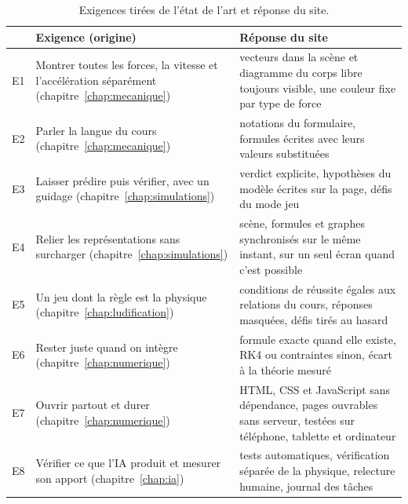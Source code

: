 \begin{table}[ht]
  \centering
  \small
  \caption{Exigences tirées de l'état de l'art et réponse du site.}
  \label{tab:exigences}
  \begin{tabularx}{\linewidth}{@{}l X X@{}}
    \toprule
    & Exigence (origine) & Réponse du site \\
    \midrule
    E1 & Montrer toutes les forces, la vitesse et l'accélération séparément
         (chapitre~\ref{chap:mecanique}) &
         vecteurs dans la scène et diagramme du corps libre toujours visible,
         une couleur fixe par type de force \\
    E2 & Parler la langue du cours (chapitre~\ref{chap:mecanique}) &
         notations du formulaire, formules écrites avec leurs valeurs
         substituées \\
    E3 & Laisser prédire puis vérifier, avec un guidage
         (chapitre~\ref{chap:simulations}) &
         verdict explicite, hypothèses du modèle écrites sur la page, défis
         du mode jeu \\
    E4 & Relier les représentations sans surcharger
         (chapitre~\ref{chap:simulations}) &
         scène, formules et graphes synchronisés sur le même instant, sur un
         seul écran quand c'est possible \\
    E5 & Un jeu dont la règle est la physique
         (chapitre~\ref{chap:ludification}) &
         conditions de réussite égales aux relations du cours, réponses
         masquées, défis tirés au hasard \\
    E6 & Rester juste quand on intègre (chapitre~\ref{chap:numerique}) &
         formule exacte quand elle existe, RK4 ou contraintes sinon, écart à
         la théorie mesuré \\
    E7 & Ouvrir partout et durer (chapitre~\ref{chap:numerique}) &
         HTML, CSS et JavaScript sans dépendance, pages ouvrables sans
         serveur, testées sur téléphone, tablette et ordinateur \\
    E8 & Vérifier ce que l'IA produit et mesurer son apport
         (chapitre~\ref{chap:ia}) &
         tests automatiques, vérification séparée de la physique, relecture
         humaine, journal des tâches \\
    \bottomrule
  \end{tabularx}
\end{table}
